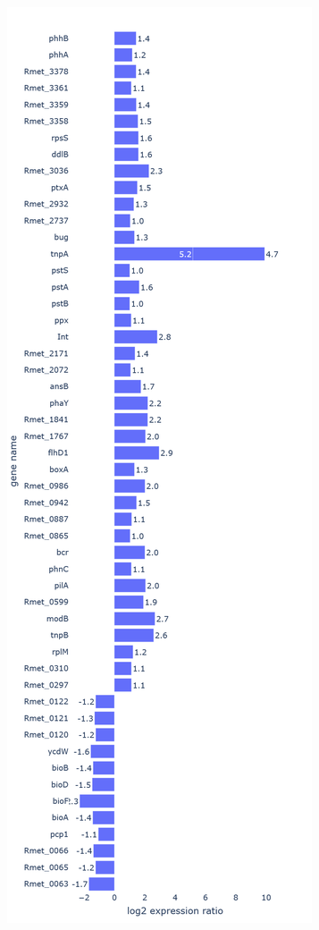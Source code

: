 \begin{figure} [ht] 
\begin{center}
\begin{subfigure}{0.48\textwidth}
    \includegraphics[width=\linewidth]{chapter3/chapter/figs/newplot(8).png}

\end{subfigure}
\end{center}
\end{figure}
